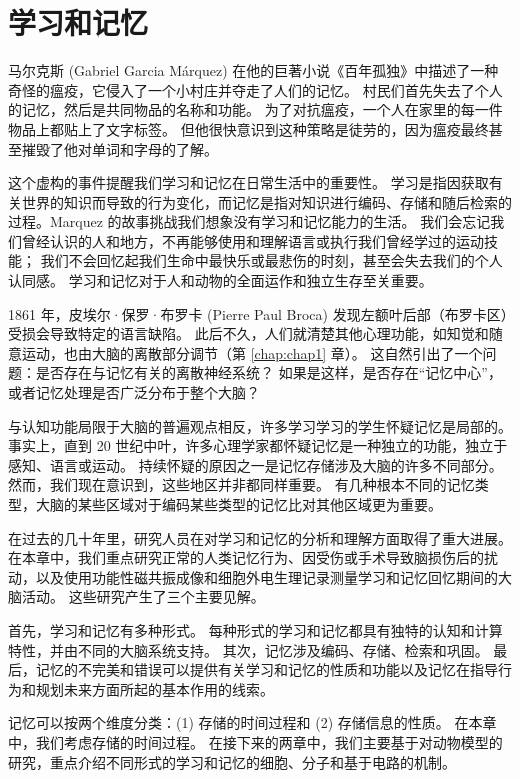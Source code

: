\chapter{学习和记忆} \label{chap:chap52}

马尔克斯 (Gabriel Garcia Márquez) 在他的巨著小说《百年孤独》中描述了一种奇怪的瘟疫，它侵入了一个小村庄并夺走了人们的记忆。
村民们首先失去了个人的记忆，然后是共同物品的名称和功能。
为了对抗瘟疫，一个人在家里的每一件物品上都贴上了文字标签。
但他很快意识到这种策略是徒劳的，因为瘟疫最终甚至摧毁了他对单词和字母的了解。


这个虚构的事件提醒我们学习和记忆在日常生活中的重要性。
学习是指因获取有关世界的知识而导致的行为变化，而记忆是指对知识进行编码、存储和随后检索的过程。Marquez 的故事挑战我们想象没有学习和记忆能力的生活。
我们会忘记我们曾经认识的人和地方，不再能够使用和理解语言或执行我们曾经学过的运动技能；
我们不会回忆起我们生命中最快乐或最悲伤的时刻，甚至会失去我们的个人认同感。
学习和记忆对于人和动物的全面运作和独立生存至关重要。


1861 年，皮埃尔·保罗·布罗卡 (Pierre Paul Broca) 发现左额叶后部（布罗卡区）受损会导致特定的语言缺陷。
此后不久，人们就清楚其他心理功能，如知觉和随意运动，也由大脑的离散部分调节（第 \ref{chap:chap1} 章）。
这自然引出了一个问题：是否存在与记忆有关的离散神经系统？
如果是这样，是否存在“记忆中心”，或者记忆处理是否广泛分布于整个大脑？


与认知功能局限于大脑的普遍观点相反，许多学习学习的学生怀疑记忆是局部的。
事实上，直到 20 世纪中叶，许多心理学家都怀疑记忆是一种独立的功能，独立于感知、语言或运动。
持续怀疑的原因之一是记忆存储涉及大脑的许多不同部分。
然而，我们现在意识到，这些地区并非都同样重要。
有几种根本不同的记忆类型，大脑的某些区域对于编码某些类型的记忆比对其他区域更为重要。


在过去的几十年里，研究人员在对学习和记忆的分析和理解方面取得了重大进展。
在本章中，我们重点研究正常的人类记忆行为、因受伤或手术导致脑损伤后的扰动，以及使用功能性磁共振成像和细胞外电生理记录测量学习和记忆回忆期间的大脑活动。
这些研究产生了三个主要见解。


首先，学习和记忆有多种形式。
每种形式的学习和记忆都具有独特的认知和计算特性，并由不同的大脑系统支持。
其次，记忆涉及编码、存储、检索和巩固。
最后，记忆的不完美和错误可以提供有关学习和记忆的性质和功能以及记忆在指导行为和规划未来方面所起的基本作用的线索。


记忆可以按两个维度分类：(1) 存储的时间过程和 (2) 存储信息的性质。
在本章中，我们考虑存储的时间过程。
在接下来的两章中，我们主要基于对动物模型的研究，重点介绍不同形式的学习和记忆的细胞、分子和基于电路的机制。



